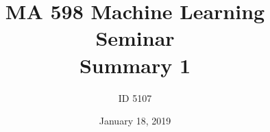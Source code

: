 \documentclass[10pt,letterpaper]{article}
\def\IDCode{5107}
\def\Title{MA 598}
\def\HomeworkNumber{1}
\def\DueBy{January 18, 2019}
\numberwithin{problem}{section}
\numberwithin{equation}{section}
\begin{document}
\title{\Title{} Machine Learning Seminar \\ Summary \HomeworkNumber{}}%
\author{ID \IDCode{}}%
\date{\DueBy{}}%
\maketitle


\end{document}
